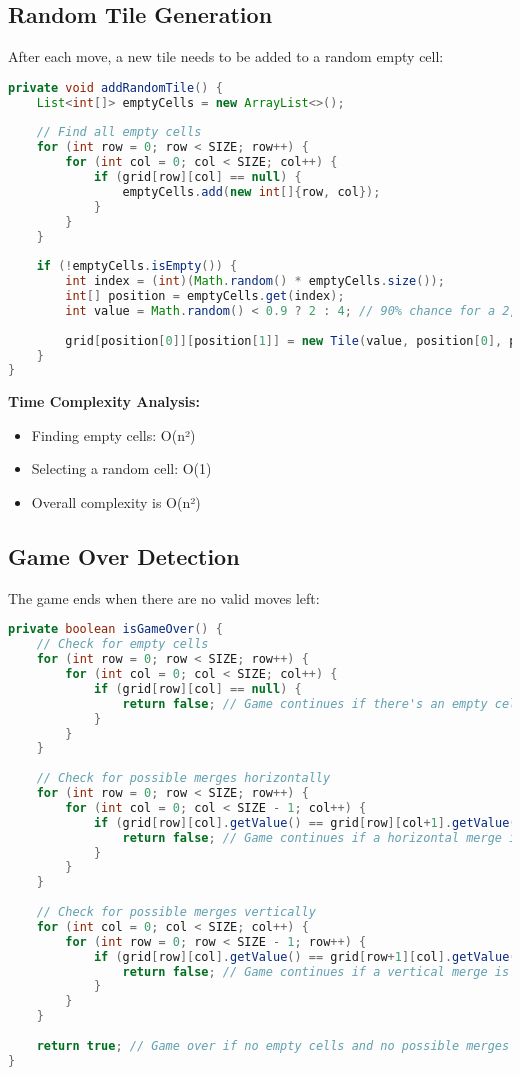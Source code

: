 \documentclass[12pt, a4paper]{article}
\begin{document}
\subsection{Random Tile Generation}
After each move, a new tile needs to be added to a random empty cell:

\begin{lstlisting}[language=Java, caption=Random Tile Generation]
private void addRandomTile() {
    List<int[]> emptyCells = new ArrayList<>();
    
    // Find all empty cells
    for (int row = 0; row < SIZE; row++) {
        for (int col = 0; col < SIZE; col++) {
            if (grid[row][col] == null) {
                emptyCells.add(new int[]{row, col});
            }
        }
    }
    
    if (!emptyCells.isEmpty()) {
        int index = (int)(Math.random() * emptyCells.size());
        int[] position = emptyCells.get(index);
        int value = Math.random() < 0.9 ? 2 : 4; // 90% chance for a 2, 10% for a 4
        
        grid[position[0]][position[1]] = new Tile(value, position[0], position[1]);
    }
}
\end{lstlisting}

\textbf{Time Complexity Analysis:}
\begin{itemize}
    \item Finding empty cells: O(n²)
    \item Selecting a random cell: O(1)
    \item Overall complexity is O(n²)
\end{itemize}

\subsection{Game Over Detection}
The game ends when there are no valid moves left:

\begin{lstlisting}[language=Java, caption=Game Over Detection]
private boolean isGameOver() {
    // Check for empty cells
    for (int row = 0; row < SIZE; row++) {
        for (int col = 0; col < SIZE; col++) {
            if (grid[row][col] == null) {
                return false; // Game continues if there's an empty cell
            }
        }
    }
    
    // Check for possible merges horizontally
    for (int row = 0; row < SIZE; row++) {
        for (int col = 0; col < SIZE - 1; col++) {
            if (grid[row][col].getValue() == grid[row][col+1].getValue()) {
                return false; // Game continues if a horizontal merge is possible
            }
        }
    }
    
    // Check for possible merges vertically
    for (int col = 0; col < SIZE; col++) {
        for (int row = 0; row < SIZE - 1; row++) {
            if (grid[row][col].getValue() == grid[row+1][col].getValue()) {
                return false; // Game continues if a vertical merge is possible
            }
        }
    }
    
    return true; // Game over if no empty cells and no possible merges
}
\end{lstlisting}
\end{document}
